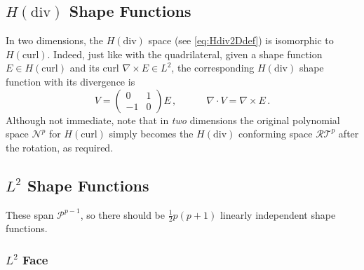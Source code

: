 %


\subsection{\texorpdfstring{$H(\mathrm{div})$}{Hdiv} Shape Functions}
\label{sec:TriangleHdiv}

In two dimensions, the $H(\mathrm{div})$ space (see \eqref{eq:Hdiv2Ddef}) is isomorphic to $H(\mathrm{curl})$. 
Indeed, just like with the quadrilateral, given a shape function $E\in H(\mathrm{curl})$ and its curl $\nabla\times E\in L^2$, the corresponding $H(\mathrm{div})$ shape function with its divergence is
\begin{equation}
    V=\begin{pmatrix}0&1\\-1&0\end{pmatrix}E\,,\quad\qquad\nabla\cdot V=\nabla\times E\,.
\end{equation}
Although not immediate, note that in \textit{two} dimensions the original polynomial space $\mathcal{N}^p$ for $H(\mathrm{curl})$ simply becomes the $H(\mathrm{div})$ conforming space $\mathcal{RT}^p$ after the rotation, as required.


\subsection{\texorpdfstring{$L^2$}{L2} Shape Functions}

These span $\mathcal{P}^{p-1}$, so there should be $\frac{1}{2}p(p+1)$ linearly independent shape functions.

\subsubsection{\texorpdfstring{$L^2$}{L2} Face}

